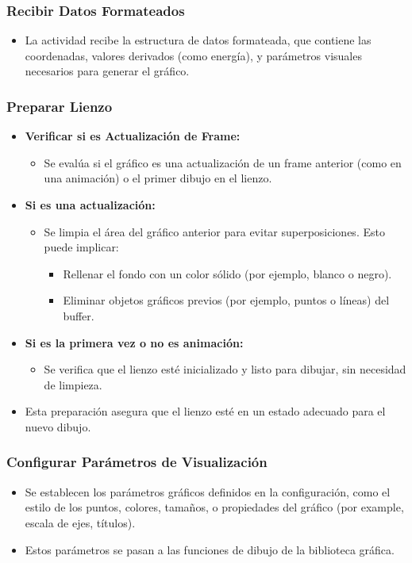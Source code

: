 \subsubsection*{Recibir Datos Formateados}
\begin{itemize}
    \item La actividad recibe la estructura de datos formateada, que contiene las coordenadas, valores derivados (como energía), y parámetros visuales necesarios para generar el gráfico.
\end{itemize}

\subsubsection*{Preparar Lienzo}
\begin{itemize}
    \item \textbf{Verificar si es Actualización de Frame:}
    \begin{itemize}
        \item Se evalúa si el gráfico es una actualización de un frame anterior (como en una animación) o el primer dibujo en el lienzo.
    \end{itemize}
    \item \textbf{Si es una actualización:}
    \begin{itemize}
        \item Se limpia el área del gráfico anterior para evitar superposiciones. Esto puede implicar:
        \begin{itemize}
            \item Rellenar el fondo con un color sólido (por ejemplo, blanco o negro).
            \item Eliminar objetos gráficos previos (por ejemplo, puntos o líneas) del buffer.
        \end{itemize}
    \end{itemize}
    \item \textbf{Si es la primera vez o no es animación:}
    \begin{itemize}
        \item Se verifica que el lienzo esté inicializado y listo para dibujar, sin necesidad de limpieza.
    \end{itemize}
    \item Esta preparación asegura que el lienzo esté en un estado adecuado para el nuevo dibujo.
\end{itemize}

\subsubsection*{Configurar Parámetros de Visualización}
\begin{itemize}
    \item Se establecen los parámetros gráficos definidos en la configuración, como el estilo de los puntos, colores, tamaños, o propiedades del gráfico (por example, escala de ejes, títulos).
    \item Estos parámetros se pasan a las funciones de dibujo de la biblioteca gráfica.
\end{itemize}

